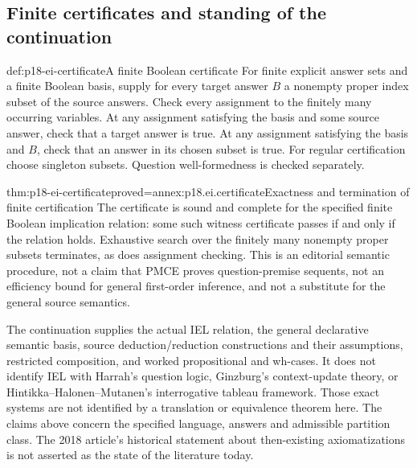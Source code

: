 \subsection{Finite certificates and standing of the continuation}

\begin{hbmethod}{def:p18-ei-certificate}{A finite Boolean certificate}
For finite explicit answer sets and a finite Boolean basis, supply for every
target answer \(B\) a nonempty proper index subset of the source answers.
Check every assignment to the finitely many occurring variables. At any
assignment satisfying the basis and some source answer, check that a target
answer is true. At any assignment satisfying the basis and \(B\), check
that an answer in its chosen subset is true. For regular certification choose
singleton subsets. Question well-formedness is checked separately.
\end{hbmethod}

\begin{hbtheorem}{thm:p18-ei-certificate}{proved=annex:p18.ei.certificate}{Exactness and termination of finite certification}
The certificate is sound and complete for the specified finite Boolean
implication relation: some such witness certificate passes if and only if
the relation holds. Exhaustive search over the finitely many nonempty proper
subsets terminates, as does assignment checking. This is an editorial
semantic procedure, not a claim that PMCE proves question-premise sequents,
not an efficiency bound for general first-order inference, and not a substitute
for the general source semantics.
\end{hbtheorem}

The continuation supplies the actual IEL relation, the general declarative
semantic basis, source deduction/reduction constructions and their assumptions,
restricted composition, and worked propositional and wh-cases. It does not
identify IEL with Harrah's question logic, Ginzburg's context-update theory,
or Hintikka--Halonen--Mutanen's interrogative tableau framework. Those exact
systems are not identified by a translation or equivalence theorem here.
The claims above concern the specified language, answers and admissible
partition class. The 2018 article's historical statement about then-existing
axiomatizations is not asserted as the state of the literature today.
